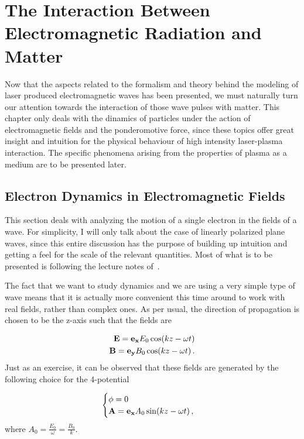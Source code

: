 \documentclass[12pt, class=report, crop=false]{standalone}
\begin{document}
\chapter{The Interaction Between Electromagnetic Radiation and Matter}%
\label{chap:light-matter-interaction}
Now that the aspects related to the formalism and theory behind the modeling of laser produced electromagnetic waves has been presented, we must naturally turn our attention towards the interaction of those wave pulses with matter. This chapter only deals with the dinamics of particles under the action of electromagnetic fields and the ponderomotive force, since these topics offer great insight and intuition for the physical behaviour of high intensity laser-plasma interaction. The specific phenomena arising from the properties of plasma as a medium are to be presented later.
\section{Electron Dynamics in Electromagnetic Fields}
This section deals with analyzing the motion of a single electron in the fields of a wave. For simplicity, I will only talk about the case of linearly polarized plane waves, since this entire discussion has the purpose of building up intuition and getting a feel for the scale of the relevant quantities. Most of what is to be presented is following the lecture notes of~\cite{karschApplicationsHighIntensity2018}.

The fact that we want to study dynamics and we are using a very simple type of wave means that it is actually more convenient this time around to work with real fields, rather than complex ones. As per usual, the direction of propagation is chosen to be the z-axis such that the fields are

\begin{subequations}
  \begin{align}
    \vb{E} =\vb{e_x} E_0 \cos(kz-\omega t) \\
    \vb{B} =\vb{e_y} B_0 \cos(kz-\omega t)\,.
  \end{align}
\end{subequations}
Just as an exercise, it can be observed that these fields are generated by the following choice for the 4-potential

\begin{equation}
  \begin{cases}
    \phi = 0 \\
    \vb{A} = \vb{e_x} A_0 \sin(kz-\omega t)\,,
  \end{cases}
\end{equation}
where \(A_0 = \frac{E_0}{\omega} = \frac{B_0}{k}\).
\end{document}
